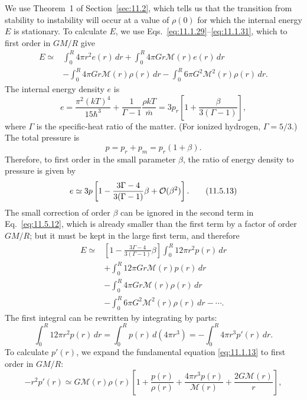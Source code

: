We use Theorem~1 of Section~\ref{sec:11.2}, which tells us that the
transition from stability to instability will occur at a value of \(\rho(0)\)
for which the internal energy \(E\) is stationary. To calculate \(E\), we use
Eqs.~\eqref{eq:11.1.29}--\eqref{eq:11.1.31}, which to first order in
\(GM/R\) give
\begin{equation}
  \begin{aligned}
  E\simeq{}&
  \int_0^R4\pi r^2e(r)\,dr
  +\int_0^R4\pi Gr\mathcal{M}(r)e(r)\,dr\\
  &-\int_0^R4\pi Gr\mathcal{M}(r)\rho(r)\,dr
  -\int_0^R6\pi G^2\mathcal{M}^2(r)\rho(r)\,dr.
  \end{aligned}
  \tag{11.5.12}\label{eq:11.5.12}
\end{equation}
The internal energy density \(e\) is
\[
  e
  =
  \frac{\pi^2(kT)^4}{15\hbar^3}
  +\frac1{\Gamma-1}\frac{\rho kT}{\bar m}
  =
  3p_r\left[1+\frac{\beta}{3(\Gamma-1)}\right],
\]
where \(\Gamma\) is the specific-heat ratio of the matter. (For ionized
hydrogen, \(\Gamma=5/3\).) The total pressure is
\[
  p=p_r+p_m=p_r(1+\beta).
\]
Therefore, to first order in the small parameter \(\beta\), the ratio of
energy density to pressure is given by
\begin{equation}
  e
  \simeq
  3p
  \left[
    1-\frac{3\Gamma-4}{3(\Gamma-1)}\beta
    +\mathcal{O}(\beta^2)
  \right].
  \tag{11.5.13}\label{eq:11.5.13}
\end{equation}
The small correction of order \(\beta\) can be ignored in the second term in
Eq.~\eqref{eq:11.5.12}, which is already smaller than the first term by a
factor of order \(GM/R\); but it must be kept in the large first term, and
therefore
\begin{equation}
  \begin{aligned}
  E\simeq{}&
  \left[1-\frac{3\Gamma-4}{3(\Gamma-1)}\beta\right]
  \int_0^R12\pi r^2p(r)\,dr\\
  &+\int_0^R12\pi Gr\mathcal{M}(r)p(r)\,dr\\
  &-\int_0^R4\pi Gr\mathcal{M}(r)\rho(r)\,dr\\
  &-\int_0^R6\pi G^2\mathcal{M}^2(r)\rho(r)\,dr-\cdots.
  \end{aligned}
  \tag{11.5.14}\label{eq:11.5.14}
\end{equation}
The first integral can be rewritten by integrating by parts:
\[
  \int_0^R12\pi r^2p(r)\,dr
  =
  \int_0^Rp(r)\,d(4\pi r^3)
  =
  -\int_0^R4\pi r^3p'(r)\,dr.
\]
To calculate \(p'(r)\), we expand the fundamental equation
\eqref{eq:11.1.13} to first order in \(GM/R\):
\[
  -r^2p'(r)
  \simeq
  G\mathcal{M}(r)\rho(r)
  \left[
    1+\frac{p(r)}{\rho(r)}
    +\frac{4\pi r^3p(r)}{\mathcal{M}(r)}
    +\frac{2G\mathcal{M}(r)}r
  \right],
\]
